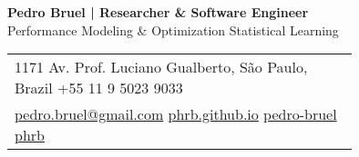 \documentclass[a4paper,10pt]{article}
\date{\today}
\title{}
\begin{document}
\parbox[top][0.12\textheight][c]{\linewidth}{ %
    \vspace{-0.08\textheight} %
    \centering %
    {\LARGE \textbf{Pedro Bruel | Researcher \& Software Engineer}}\\\medskip %
    {\Large Performance Modeling \& Optimization \textbullet{} Statistical Learning}
}


\parbox[top][0.12\textheight][c]{\linewidth}{ %
    \vspace{-0.19\textheight} %
    \centering
    \colorbox{shade}{ %
        \begin{supertabular}{p{0.75\linewidth}} %
            \raisebox{-1pt}{\faHome} \hspace{0.15cm} 1171 Av. Prof. Luciano Gualberto, São Paulo, Brazil \hspace{0.2cm} \raisebox{-1pt}{\faPhone} \hspace{0.14cm} +55 11 9 5023 9033 \\ %
            \raisebox{0pt}{\small\faEnvelope} \hspace{0.2cm} \href{mailto:pedro.bruel@gmail.com}{pedro.bruel@gmail.com} \hspace{0.2cm} \raisebox{0pt}{\small\faDesktop} \hspace{0.2cm} \href{https://phrb.github.io}{phrb.github.io} \hspace{0.31cm} \raisebox{-1pt}{\faLinkedin} \hspace{0.2cm} \href{https://www.linkedin.com/in/pedro-bruel}{pedro-bruel} \hspace{0.2cm} \raisebox{-1pt}{\faGithub} \hspace{0.2cm} \href{https://github.com/phrb}{phrb} \\
        \end{supertabular}
    }
}
\end{document}
